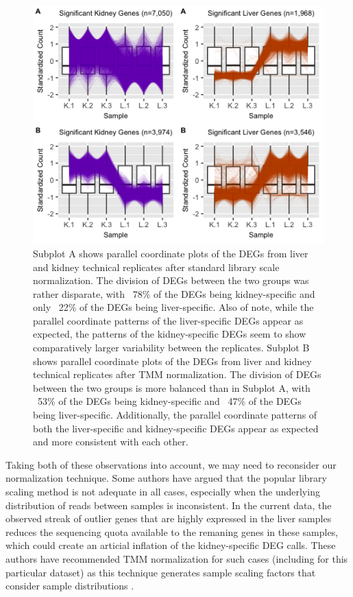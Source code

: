 \documentclass{bioinfo}
\begin{document}
\begin{figure}[!tpb]
\centerline{\includegraphics[width=1\columnwidth]{../MakeFigures/lkClusters.jpg}}
\caption{Subplot A shows parallel coordinate plots of the DEGs from liver and kidney technical replicates after standard library scale normalization. The division of DEGs between the two groups was rather disparate, with ~78\% of the DEGs being kidney-specific and only ~22\% of the DEGs being liver-specific. Also of note, while the parallel coordinate patterns of the liver-specific DEGs appear as expected, the patterns of the kidney-specific DEGs seem to show comparatively larger variability between the replicates. Subplot B shows parallel coordinate plots of the DEGs from liver and kidney technical replicates after TMM normalization. The division of DEGs between the two groups is more balanced than in Subplot A, with ~53\% of the DEGs being kidney-specific and ~47\% of the DEGs being liver-specific. Additionally, the parallel coordinate patterns of both the liver-specific and kidney-specific DEGs appear as expected and more consistent with each other.
\label{lkClusters}}
\end{figure} 

Taking both of these observations into account, we may need to reconsider our normalization technique. Some authors have argued that the popular library scaling method is not adequate in all cases, especially when the underlying distribution of reads between samples is inconsistent. In the current data, the observed streak of outlier genes that are highly expressed in the liver samples reduces the sequencing quota available to the remaning genes in these samples, which could create an articial inflation of the kidney-specific DEG calls. These authors have recommended TMM normalization for such cases (including for this particular dataset) as this technique generates sample scaling factors that consider sample distributions \citep{RobinsonOshlack}.
\end{document}
